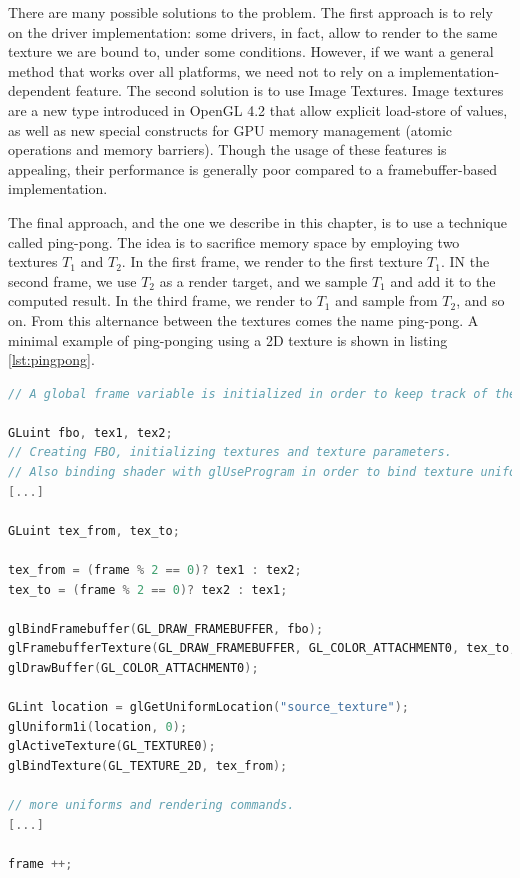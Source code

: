 There are many possible solutions to the problem. The first approach is to rely on the driver implementation: some drivers, in fact, allow to render to the same texture we are bound to, under some conditions. However, if we want a general method that works over all platforms, we need not to rely on a implementation-dependent feature. The second solution is to use Image Textures. Image textures are a new type introduced in OpenGL 4.2 that allow explicit load-store of values, as well as new special constructs for GPU memory management (atomic operations and memory barriers). Though the usage of these features is appealing, their performance is generally poor compared to a framebuffer-based implementation. 

The final approach, and the one we describe in this chapter, is to use a technique called ping-pong. The idea is to sacrifice memory space by employing two textures $T_1$ and $T_2$. In the first frame, we render to the first texture $T_1$. IN the second frame, we use $T_2$ as a render target, and we sample $T_1$ and add it to the computed result. In the third frame, we render to $T_1$ and sample from $T_2$, and so on. From this alternance between the textures comes the name ping-pong. A minimal example of ping-ponging using a 2D texture is shown in listing \ref{lst:pingpong}.

\begin{lstlisting}[language=C++,label=lst:pingpong,caption={Minimal example of ping-pong textures.}]
// A global frame variable is initialized in order to keep track of the current frame

GLuint fbo, tex1, tex2;
// Creating FBO, initializing textures and texture parameters.
// Also binding shader with glUseProgram in order to bind texture uniforms
[...]

GLuint tex_from, tex_to;

tex_from = (frame % 2 == 0)? tex1 : tex2;
tex_to = (frame % 2 == 0)? tex2 : tex1;

glBindFramebuffer(GL_DRAW_FRAMEBUFFER, fbo);
glFramebufferTexture(GL_DRAW_FRAMEBUFFER, GL_COLOR_ATTACHMENT0, tex_to, 0);
glDrawBuffer(GL_COLOR_ATTACHMENT0);

GLint location = glGetUniformLocation("source_texture");
glUniform1i(location, 0);
glActiveTexture(GL_TEXTURE0);
glBindTexture(GL_TEXTURE_2D, tex_from);

// more uniforms and rendering commands.
[...]

frame ++;
\end{lstlisting}


